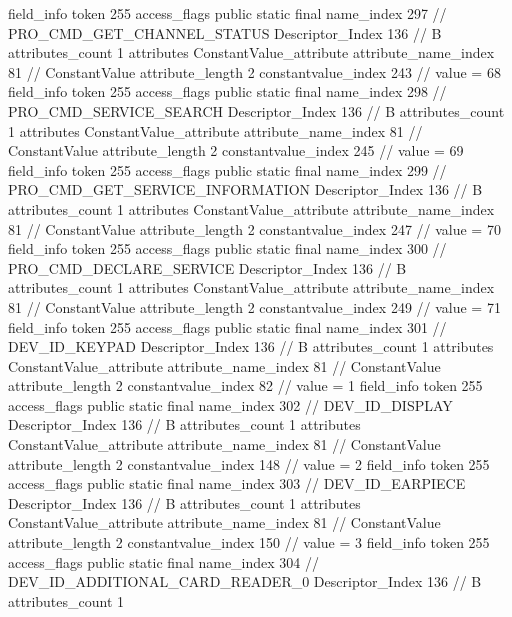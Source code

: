 {{{{{{{				}
				}
			}
			field_info {
				token	255
				access_flags	public static final
				name_index	297		// PRO_CMD_GET_CHANNEL_STATUS
				Descriptor_Index	136		// B
				attributes_count	1
				attributes {
				ConstantValue_attribute {
					attribute_name_index	81		// ConstantValue
					attribute_length	2
					constantvalue_index	243		// value = 68
				}
				}
			}
			field_info {
				token	255
				access_flags	public static final
				name_index	298		// PRO_CMD_SERVICE_SEARCH
				Descriptor_Index	136		// B
				attributes_count	1
				attributes {
				ConstantValue_attribute {
					attribute_name_index	81		// ConstantValue
					attribute_length	2
					constantvalue_index	245		// value = 69
				}
				}
			}
			field_info {
				token	255
				access_flags	public static final
				name_index	299		// PRO_CMD_GET_SERVICE_INFORMATION
				Descriptor_Index	136		// B
				attributes_count	1
				attributes {
				ConstantValue_attribute {
					attribute_name_index	81		// ConstantValue
					attribute_length	2
					constantvalue_index	247		// value = 70
				}
				}
			}
			field_info {
				token	255
				access_flags	public static final
				name_index	300		// PRO_CMD_DECLARE_SERVICE
				Descriptor_Index	136		// B
				attributes_count	1
				attributes {
				ConstantValue_attribute {
					attribute_name_index	81		// ConstantValue
					attribute_length	2
					constantvalue_index	249		// value = 71
				}
				}
			}
			field_info {
				token	255
				access_flags	public static final
				name_index	301		// DEV_ID_KEYPAD
				Descriptor_Index	136		// B
				attributes_count	1
				attributes {
				ConstantValue_attribute {
					attribute_name_index	81		// ConstantValue
					attribute_length	2
					constantvalue_index	82		// value = 1
				}
				}
			}
			field_info {
				token	255
				access_flags	public static final
				name_index	302		// DEV_ID_DISPLAY
				Descriptor_Index	136		// B
				attributes_count	1
				attributes {
				ConstantValue_attribute {
					attribute_name_index	81		// ConstantValue
					attribute_length	2
					constantvalue_index	148		// value = 2
				}
				}
			}
			field_info {
				token	255
				access_flags	public static final
				name_index	303		// DEV_ID_EARPIECE
				Descriptor_Index	136		// B
				attributes_count	1
				attributes {
				ConstantValue_attribute {
					attribute_name_index	81		// ConstantValue
					attribute_length	2
					constantvalue_index	150		// value = 3
				}
				}
			}
			field_info {
				token	255
				access_flags	public static final
				name_index	304		// DEV_ID_ADDITIONAL_CARD_READER_0
				Descriptor_Index	136		// B
				attributes_count	1
}}}}}
